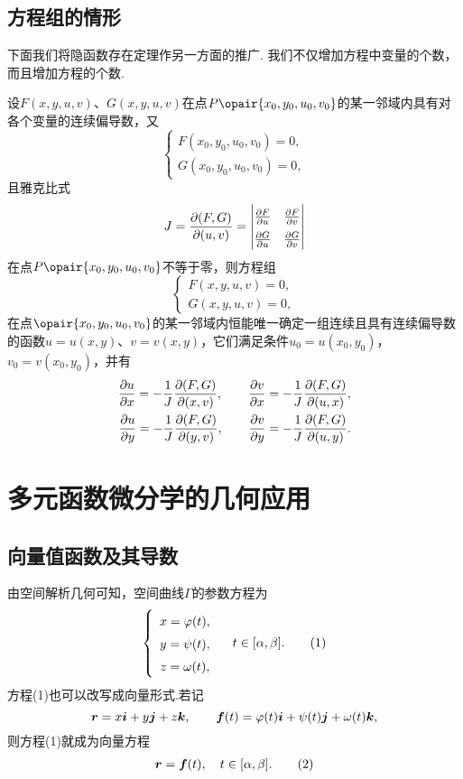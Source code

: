 \subsection{方程组的情形}
下面我们将隐函数存在定理作另一方面的推广.
我们不仅增加方程中变量的个数，而且增加方程的个数.

\begin{theorem}[隐函数存在定理3]\label{theorem:多元函数微分法.隐函数存在定理3}
设\(F(x,y,u,v)\)、\(G(x,y,u,v)\)在点\(P\opair{x_0,y_0,u_0,v_0}\)的某一邻域内具有对各个变量的连续偏导数，又\[
\left\{ \begin{array}{c}
F(x_0,y_0,u_0,v_0)=0, \\
G(x_0,y_0,u_0,v_0)=0,
\end{array} \right.
\]且雅克比式\[
J=\jacobi{F,G}{u,v}={
\def\arraystretch{1.5}
\begin{vmatrix}
\pdv{F}{u} & \pdv{F}{v} \\
\pdv{G}{u} & \pdv{G}{v}
\end{vmatrix}
}
\]在点\(P\opair{x_0,y_0,u_0,v_0}\)不等于零，则方程组\[
\left\{ \begin{array}{c}
F(x,y,u,v)=0, \\
G(x,y,u,v)=0,
\end{array} \right.
\]在点\(\opair{x_0,y_0,u_0,v_0}\)的某一邻域内恒能唯一确定一组连续且具有连续偏导数的函数\(u=u(x,y)\)、\(v=v(x,y)\)，它们满足条件\(u_0=u(x_0,y_0)\)，\(v_0=v(x_0,y_0)\)，并有
\begin{equation}\label{equation:多元函数微分法.隐函数存在定理3.一阶偏导数}
\begin{split}
\pdv{u}{x}
= -\frac{1}{J} \pdv{(F,G)}{(x,v)},
\qquad
\pdv{v}{x}
= -\frac{1}{J} \pdv{(F,G)}{(u,x)},
\\
\pdv{u}{y}
= -\frac{1}{J} \pdv{(F,G)}{(y,v)},
\qquad
\pdv{v}{y}
= -\frac{1}{J} \pdv{(F,G)}{(u,y)}.
\end{split}
\end{equation}
\end{theorem}

\section{多元函数微分学的几何应用}
\subsection{向量值函数及其导数}
由空间解析几何可知，空间曲线\(\Gamma\)的参数方程为\begin{gather}
\left\{ \begin{array}{c}
x=\varphi(t), \\
y=\psi(t), \\
z=\omega(t),
\end{array} \right. \quad
t \in [\alpha,\beta].
\tag1
\end{gather}方程(1)也可以改写成向量形式.若记\[
\boldsymbol{r}=x\boldsymbol{i}+y\boldsymbol{j}+z\boldsymbol{k},
\qquad
\boldsymbol{f}(t)=\varphi(t)\boldsymbol{i}+\psi(t)\boldsymbol{j}+\omega(t)\boldsymbol{k},
\]则方程(1)就成为向量方程\begin{gather}
\mat{r}=\mat{f}(t), \quad t \in [\alpha,\beta].
\tag2
\end{gather}

